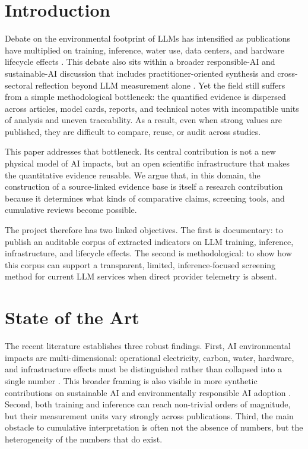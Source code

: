 \documentclass[11pt,a4paper]{article}
\begin{document}
\section{Introduction}
Debate on the environmental footprint of LLMs has intensified as publications have multiplied on training, inference, water use, data centers, and hardware lifecycle effects \cite{strubell2019,rillig2023,luccioni2023,ren2024,morrison2025,elsworth2025,li2025water}. This debate also sits within a broader responsible-AI and sustainable-AI discussion that includes practitioner-oriented synthesis and cross-sectoral reflection beyond LLM measurement alone \cite{pachot2022book,pachot2023sustainableai}. Yet the field still suffers from a simple methodological bottleneck: the quantified evidence is dispersed across articles, model cards, reports, and technical notes with incompatible units of analysis and uneven traceability. As a result, even when strong values are published, they are difficult to compare, reuse, or audit across studies.

This paper addresses that bottleneck. Its central contribution is not a new physical model of AI impacts, but an open scientific infrastructure that makes the quantitative evidence reusable. We argue that, in this domain, the construction of a source-linked evidence base is itself a research contribution because it determines what kinds of comparative claims, screening tools, and cumulative reviews become possible.

The project therefore has two linked objectives. The first is documentary: to publish an auditable corpus of extracted indicators on LLM training, inference, infrastructure, and lifecycle effects. The second is methodological: to show how this corpus can support a transparent, limited, inference-focused screening method for current LLM services when direct provider telemetry is absent.

\section{State of the Art}
The recent literature establishes three robust findings. First, AI environmental impacts are multi-dimensional: operational electricity, carbon, water, hardware, and infrastructure effects must be distinguished rather than collapsed into a single number \cite{rillig2023}. This broader framing is also visible in more synthetic contributions on sustainable AI and environmentally responsible AI adoption \cite{pachot2022book,pachot2023sustainableai}. Second, both training and inference can reach non-trivial orders of magnitude, but their measurement units vary strongly across publications. Third, the main obstacle to cumulative interpretation is often not the absence of numbers, but the heterogeneity of the numbers that do exist.
\end{document}
